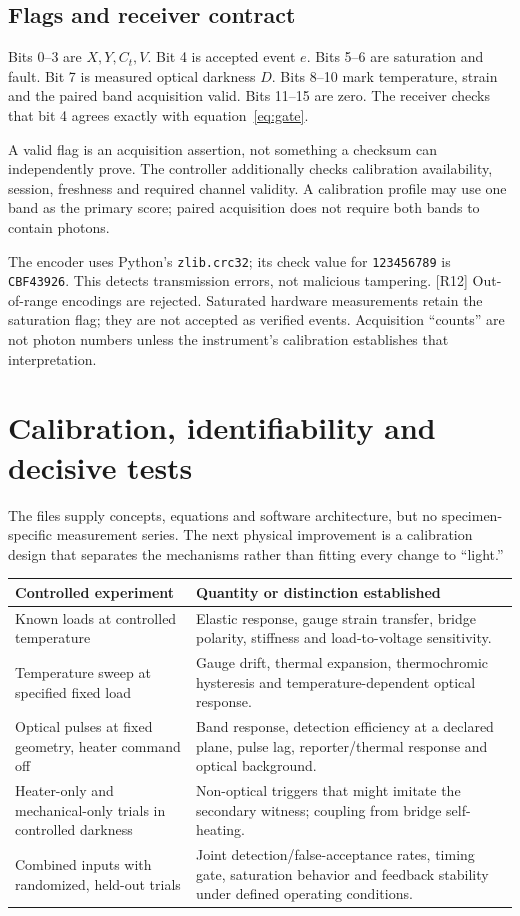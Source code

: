 \documentclass[10pt,a4paper]{article}
\numberwithin{equation}{section}
\newcommand{\newpart}{\clearpage}
\begin{document}
\subsection*{Flags and receiver contract}
Bits 0--3 are $X,Y,C_t,V$. Bit 4 is accepted event $e$. Bits 5--6 are saturation and fault. Bit 7 is measured optical darkness $D$. Bits 8--10 mark temperature, strain and the paired band acquisition valid. Bits 11--15 are zero. The receiver checks that bit 4 agrees exactly with equation~\eqref{eq:gate}.

A valid flag is an acquisition assertion, not something a checksum can independently prove. The controller additionally checks calibration availability, session, freshness and required channel validity. A calibration profile may use one band as the primary score; paired acquisition does not require both bands to contain photons.

The encoder uses Python's \texttt{zlib.crc32}; its check value for \texttt{123456789} is \texttt{CBF43926}. This detects transmission errors, not malicious tampering. [R12] Out-of-range encodings are rejected. Saturated hardware measurements retain the saturation flag; they are not accepted as verified events. Acquisition ``counts'' are not photon numbers unless the instrument's calibration establishes that interpretation.

\newpart
\section{Calibration, identifiability and decisive tests}
\label{sec:calibration}

The files supply concepts, equations and software architecture, but no specimen-specific measurement series. The next physical improvement is a calibration design that separates the mechanisms rather than fitting every change to ``light.''

\small
\begin{tabularx}{\linewidth}{@{}P{34mm}Y@{}}
\toprule
\textbf{Controlled experiment} & \textbf{Quantity or distinction established}\\
\midrule
Known loads at controlled temperature & Elastic response, gauge strain transfer, bridge polarity, stiffness and load-to-voltage sensitivity.\\
Temperature sweep at specified fixed load & Gauge drift, thermal expansion, thermochromic hysteresis and temperature-dependent optical response.\\
Optical pulses at fixed geometry, heater command off & Band response, detection efficiency at a declared plane, pulse lag, reporter/thermal response and optical background.\\
Heater-only and mechanical-only trials in controlled darkness & Non-optical triggers that might imitate the secondary witness; coupling from bridge self-heating.\\
Combined inputs with randomized, held-out trials & Joint detection/false-acceptance rates, timing gate, saturation behavior and feedback stability under defined operating conditions.\\
\bottomrule
\end{tabularx}
\normalsize
\end{document}

